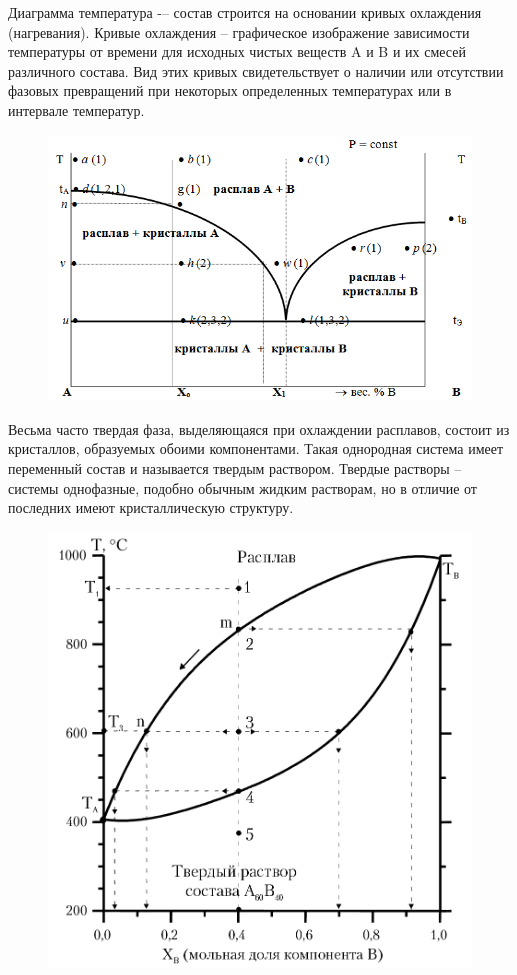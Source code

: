 \documentclass[14pt,a4paper]{scrartcl}
\begin{document}
Диаграмма температура -– состав строится на основании кривых охлаждения (нагревания). Кривые охлаждения – графическое изображение зависимости температуры от времени для исходных чистых веществ A и B и их смесей различного состава. Вид этих кривых свидетельствует о наличии или отсутствии фазовых превращений при некоторых определенных температурах или в интервале температур. 
\begin{figure}[H]
\centering
\includegraphics[scale=.45]{cristallization-diagram.png}
\caption{}
\label{}
\end{figure}

Весьма часто твердая фаза, выделяющаяся при охлаждении расплавов, состоит из кристаллов, образуемых обоими компонентами. Такая однородная система имеет переменный состав и называется твердым раствором. Твердые растворы – системы однофазные, подобно обычным жидким растворам, но в отличие от последних имеют кристаллическую структуру.

\begin{figure}[H]
\centering
\includegraphics[scale=.600]{cristallization-diagram2.png}
\caption{}
\label{}
\end{figure}
\end{document}
